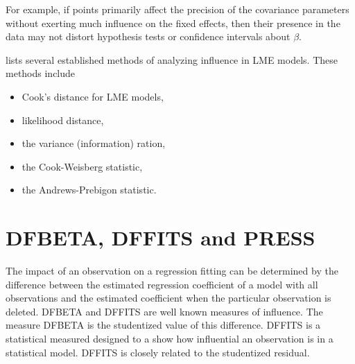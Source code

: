 \documentclass[12pt, a4paper]{report}
\theoremstyle{plain}
\theoremstyle{definition}
\theoremstyle{remark}
\begin{document}
For example, if points primarily affect the precision of the covariance parameters without exerting much influence on the fixed effects, then their presence in the data may not distort hypothesis
tests or confidence intervals about $\beta$.






\citet{Zewotir} lists several established methods of analyzing influence in LME models. These methods include \begin{itemize}
	\item Cook's distance for LME models,
	\item {} likelihood distance,
	\item the variance (information) ration,
	\item the  Cook-Weisberg statistic,
	\item the  Andrews-Prebigon statistic.
\end{itemize}


\section{DFBETA, DFFITS and PRESS}

The impact of an observation on a regression fitting can be determined by the difference between the estimated regression coefficient of a model with all observations and the estimated coefficient when the particular observation is deleted. DFBETA and DFFITS are well known measures of influence. The measure DFBETA is the studentized value of this difference. DFFITS is a statistical measured designed to a show how influential an observation is in a statistical model. DFFITS is closely related to the studentized residual.
%	
%	
\end{document}
